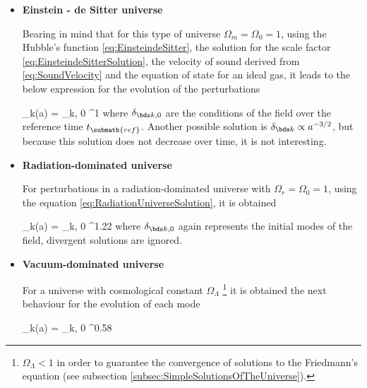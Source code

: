 \newpage
\begin{itemize}
\item \textbf{Einstein - de Sitter universe}


Bearing in mind that for this type of universe $\Omega_m = \Omega_0 = 1$, 
using the Hubble's function \ref{eq:EinsteindeSitter}, the solution for 
the scale factor \ref{eq:EinsteindeSitterSolution}, the velocity of sound 
derived from \ref{eq:SoundVelocity} and the equation of state for an ideal 
gas, it leads to the below expression for the evolution of the 
perturbations


{ \delta_{\bds k}(a) = \delta_{\bds k, 0} ^{1} }
where $\delta_{\bds k, 0}$ are the conditions of the field over the 
reference time $t_{\submath{ref}}$. Another possible solution is 
$\delta_{\bds k}\propto a^{-3/2}$, but because this solution does not 
decrease over time, it is not interesting.



\item \textbf{Radiation-dominated universe}


For perturbations in a radiation-dominated universe with $\Omega_r = 
\Omega_0 = 1$, using the equation \ref{eq:RadiationUniverseSolution}, it
is obtained


{ \delta_{\bds k}(a) = \delta_{\bds k, 0} ^{1.22} }
where $\delta_{\bds k, 0}$ again represents  the initial modes of the 
field, divergent solutions are ignored.



\item \textbf{Vacuum-dominated universe}
			

For a universe with cosmological constant $\Omega_\Lambda$
\footnote{$\Omega_\Lambda < 1 $ in order to guarantee the convergence of 
solutions to the Friedmann's equation (see subsection 
\ref{subsec:SimpleSolutionsOfTheUniverse}).} it is obtained the next 
behaviour for the evolution of each mode



{ \delta_{\bds k}(a) = \delta_{\bds k, 0} ^{0.58} }
\end{itemize}


